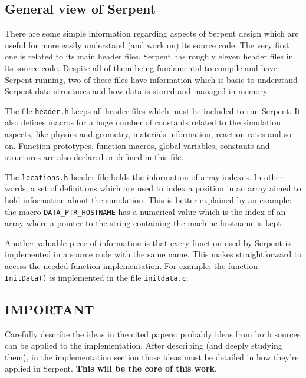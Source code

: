 \documentclass[twoside,a4paper,12pt,english]{anstrans}
\begin{document}

\subsection{General view of Serpent}

There are some simple information regarding aspects of Serpent design which are
useful for more easily understand (and work on) its source code. The very first one is related to its
main header files. Serpent has roughly eleven header files in its source code. Despite all of them
being fundamental to compile and have Serpent running, two of these files have information which
is basic to understand Serpent data structures and how data is stored and managed in memory.

The file \texttt{header.h} keeps all header files which must be included to run Serpent.
It also defines macros for a huge number of constants related to the simulation aspects, like
physics and geometry, materials information, reaction rates and so on. Function prototypes, function
macros, global variables, constants and structures are also declared or defined in this file.

The \texttt{locations.h} header file holds the information of array indexes. In other words, a set of
definitions which are used to index a position in an array aimed to hold information about the simulation.
This is better explained by an example: the macro \texttt{DATA\_PTR\_HOSTNAME} has a numerical value
which is the index of an array where a pointer to the string containing the machine hostname is kept.

Another valuable piece of information is that every function used by Serpent
is implemented in a source code with the same name. This makes straightforward to access the needed
function implementation. For example, the function \texttt{InitData()} is implemented in the file
\texttt{initdata.c}.

\subsection{IMPORTANT}
Carefully describe the ideas in the cited papers: probably ideas from both sources can be applied to
the implementation. After describing (and deeply studying them), in the implementation section those
ideas must be detailed in how they're applied in Serpent. \textbf{This will be the core of this work}.
\end{document}
